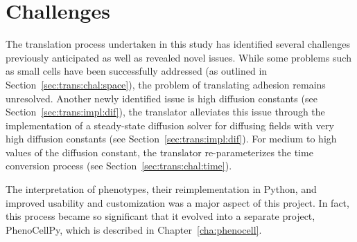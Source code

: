 \section{Challenges}\label{sec:trans:chal}
The translation process undertaken in this study has identified several challenges previously anticipated as well as revealed novel issues. While some problems such as small cells have been successfully addressed (as outlined in Section~\ref{sec:trans:chal:space}), the problem of translating adhesion remains unresolved. Another newly identified issue is high diffusion constants (see Section~\ref{sec:trans:impl:dif}), the translator alleviates this issue through the implementation of a steady-state diffusion solver for diffusing fields with very high diffusion constants (see Section~\ref{sec:trans:impl:dif}). For medium to high values of the diffusion constant, the translator re-parameterizes the time conversion process (see Section~\ref{sec:trans:chal:time}).

The interpretation of phenotypes, their reimplementation in Python, and improved usability and customization was a major aspect of this project. In fact, this process became so significant that it evolved into a separate project, PhenoCellPy, which is described in Chapter~\ref{cha:phenocell}.

